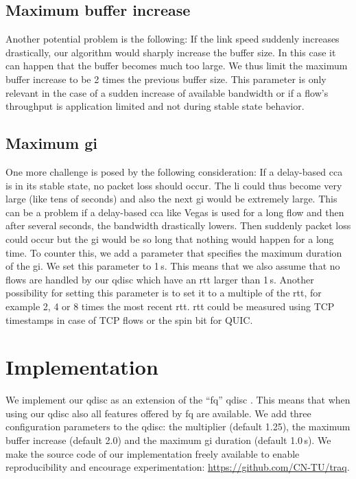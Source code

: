 \documentclass[10pt,sigconf,letterpaper,dvipsnames\ifx\removeHeaders\tempYes ,nonacm\fi]{acmart}
\begin{document}
\subsection{Maximum buffer increase}

Another potential problem is the following: If the link speed suddenly increases drastically, our algorithm would sharply increase the buffer size. In this case it can happen that the buffer becomes much too large. We thus limit the maximum buffer increase to be 2 times the previous buffer size. This parameter is only relevant in the case of a sudden increase of available bandwidth or if a flow's throughput is application limited and not during stable state behavior. 

\subsection{Maximum \gls{gi}}

One more challenge is posed by the following consideration: If a delay-based \gls{cca} is in its stable state, no packet loss should occur. The \gls{li} could thus become very large (like tens of seconds) and also the next \gls{gi} would be extremely large. This can be a problem if a delay-based \gls{cca} like Vegas \cite{brakmo_tcp_1995} is used for a long flow and then after several seconds, the bandwidth drastically lowers. Then suddenly packet loss could occur but the \gls{gi} would be so long that nothing would happen for a long time. To counter this, we add a parameter that specifies the maximum duration of the \gls{gi}. We set this parameter to 1\,s. This means that we also assume that no flows are handled by our \gls{qdisc} which have an \gls{rtt} larger than 1\,s. Another possibility for setting this parameter is to set it to a multiple of the \gls{rtt}, for example 2, 4 or 8 times the most recent \gls{rtt}. \gls{rtt} could be measured using TCP timestamps \cite{borman_tcp_2014} in case of TCP flows or the spin bit \cite{kuhlewind_quic_2018} for QUIC. 

\section{Implementation}

We implement our \gls{qdisc} as an extension of the ``fq'' \gls{qdisc} \cite{dumazet_pkt_sched:_2013}. This means that when using our \gls{qdisc} also all features offered by fq are available. We add three configuration parameters to the \gls{qdisc}: the multiplier (default 1.25), the maximum buffer increase (default 2.0) and the maximum \gls{gi} duration (default 1.0\,s). We make the source code of our implementation freely available to enable reproducibility and encourage experimentation: \url{https://github.com/CN-TU/traq}.
\end{document}
